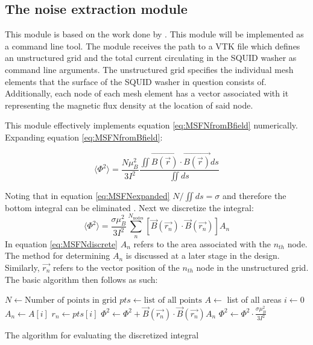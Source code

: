 \subsection{The noise extraction module}
This module is based on the work done by \cite{fluxNoiseSquidsStevenAnton}. This module will be implemented as a command line tool. The module receives the path to a VTK file which defines an unstructured grid and the total current circulating in the SQUID washer as command line arguments. The unstructured grid specifies the individual mesh elements that the surface of the SQUID washer in question consists of. Additionally, each node of each mesh element has a vector associated with it representing the magnetic flux density at the location of said node. \par
This module effectively implements equation \ref{eq:MSFNfromBfield} numerically. Expanding equation \ref{eq:MSFNfromBfield}:


\begin{equation}
    \langle \Phi ^2 \rangle = \frac{N\mu_B^2}{3I^2} \frac{\iint \Vec{B(\Vec{r})}\cdot\Vec{B(\Vec{r})} ds}{\iint ds}
    \label{eq:MSFNexpanded}
\end{equation}

Noting that in equation \ref{eq:MSFNexpanded} $N/\iint ds = \sigma$ and therefore the bottom integral can be eliminated \cite{fluxNoiseSquidsStevenAnton}. Next we discretize the integral: 
\begin{equation}
    \langle \Phi ^2 \rangle = \frac{\sigma\mu_B^2}{3I^2}\sum_{n}^{N_{\text{nodes}}}[\Vec{B}(\Vec{r_n})\cdot\Vec{B}(\Vec{r_n})]A_n
    \label{eq:MSFNdiscrete}
\end{equation}
In equation \ref{eq:MSFNdiscrete} $A_n$ refers to the area associated with the $n_{th}$ node. The method for determining $A_n$ is discussed at a later stage in the design. Similarly, $\Vec{r_n}$ refers to the vector position of the $n_{th}$ node in the unstructured grid. The basic algorithm then follows as such:
\begin{algorithm}
\begin{algorithmic}
    \State $N \gets \text{Number of points in grid}$
    \State $pts \gets \text{list of all points}$
    \State $A \gets $ list of all areas
    \State $i \gets 0$ 
        \State $A_n \gets A[i]$
        \State $r_n \gets pts[i]$ 
        \State $\Phi^2 \gets \Phi^2 + \Vec{B}(\Vec{r_n})\cdot \Vec{B}(\Vec{r_n}) A_n$ 
    \EndWhile
    \State $\Phi^2 \gets \Phi^2 \cdot \frac{\sigma\mu_B^2}{3I^2}$ 
\end{algorithmic}
\caption{The algorithm for evaluating the discretized integral}
\end{algorithm}

